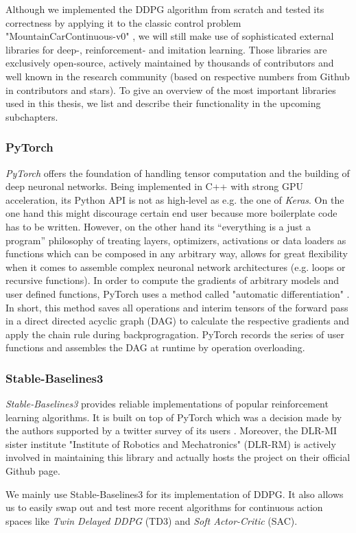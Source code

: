 Although we implemented the DDPG algorithm from scratch and tested its correctness by applying it to the classic control problem "MountainCarContinuous-v0" \cite[]{moore1990efficient}, we will still make use of sophisticated external libraries for deep-, reinforcement- and imitation learning. Those libraries are exclusively open-source, actively maintained by thousands of contributors and well known in the research community (based on respective numbers from Github in contributors and stars). To give an overview of the most important libraries used in this thesis, we list and describe their functionality in the upcoming subchapters.

\subsubsection{PyTorch}
\textit{PyTorch} \cite[]{NEURIPS2019_9015} offers the foundation of handling tensor computation and the building of deep neuronal networks. Being implemented in C++ with strong GPU acceleration, its Python API is not as high-level as e.g. the one of \textit{Keras}. On the one hand this might discourage certain end user because more boilerplate code has to be written. However, on the other hand its  “everything is a just a program” philosophy \cite[p.~4]{NEURIPS2019_9015} of treating layers, optimizers, activations or data loaders as functions which can be composed in any arbitrary way, allows for great flexibility when it comes to assemble complex neuronal network architectures (e.g. loops or recursive functions). In order to compute the gradients of arbitrary models and user defined functions, PyTorch uses a method called "automatic differentiation" \cite[p.~5]{NEURIPS2019_9015}. In short, this method saves all operations and interim tensors of the forward pass in a direct directed acyclic graph (DAG) to calculate the respective gradients and apply the chain rule during backprogragation. PyTorch records the series of user functions and assembles the DAG at runtime by operation overloading.

\subsubsection{Stable-Baselines3}
\textit{Stable-Baselines3} \cite[]{stable-baselines3} provides reliable implementations of popular reinforcement learning algorithms. It is built on top of PyTorch which was a decision made by the authors supported by a twitter survey of its users \cite[]{pytorch-survey}. Moreover, the DLR-MI sister institute "Institute of Robotics and Mechatronics" (DLR-RM) is actively involved in maintaining this library and actually hosts the project on their official Github page.
\par
We mainly use Stable-Baselines3 for its implementation of DDPG. It also allows us to easily swap out and test more recent algorithms for continuous action spaces like \textit{Twin Delayed DDPG} (TD3) and \textit{Soft Actor-Critic} (SAC). 

